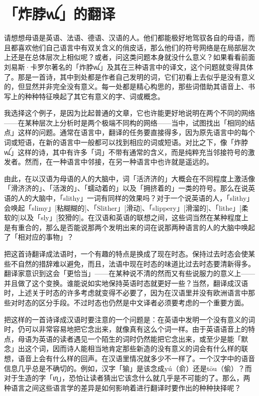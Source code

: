 \documentclass[
  12pt,
  twoside,
  openright,
  oldfontcommands,
]{memoir}
\begin{document}
\section{「炸脖{\gebfont ꪡ}」的翻译}

请想想母语是英语、法语、德语、汉语的人。他们都能极好地驾驭各自的母语，而且都喜欢他们自己语言中有双关含义的俏皮话，那么他们的符号网络是在局部层次上还是在总体层次上相似呢？或者，问这类问题本身就没什么意义？如果看看前面刘易斯·卡罗尔著名的「炸脖{\gebfont ꪡ}」及其在三种语言中的译文，这个问题就变得具体了。那是一首诗，其中到处都是作者自己发明的词，它们初看上去似乎是没有意义的，但显然并非完全没有意义。每一处都是精心构思的，那些词借助其语音上、书写上的种种特征唤起了其它有意义的字、词或概念。

我选择这个例子，是因为比起普通的文章，它也许能更好地说明在两个不同的网络------在某种层次上分析时是两个极端不同构的网络------当中，试图找出「相同的结点」这样的问题。通常在语言中，翻译的任务要直接得多，因为原先语言中的每个词或短语，在新的语言中一般都可以找到相应的词或短语。对比之下，像「炸脖{\gebfont ꪡ}」这样的诗，其中有许多「词」不带有通常的含义，而是纯粹充当邻接符号的激发者。然而，在一种语言中邻接，在另一种语言中也许就是遥远的。

由此，在以汉语为母语的人的大脑中，词「活济济的」大概会在不同程度上激活像「滑济济的」、「活泼的」、「蠕动着的」以及「拥挤着的」一类的符号。那么在说英语的人的大脑中，「slithy」一词有同样的效果吗？对于一个说英语的人，「slithy」会唤起「slimy」{[}粘糊糊的{]}、「Slither」{[}滑动{]}、「slippery」{[}滑溜的{]}、「lithe」{[}柔软的{]}以及「sly」{[}狡猾的{]}。在汉语和英语的联想之间，这些词当然在某种程度上是有重合的，那么是否能说那两个发明出来的词在说那两种语言的人的大脑中唤起了「相对应的事物」？

把这首诗翻译成法语时，一个有趣的特点是换成了现在时态。保持过去时态会使某些不自然的措辞难以避免，而且，法语中现在时态的味道比过去时态要清新得多。翻译家意识到这会「更恰当」------在某种说不清的然而又有些说服力的意义上------并且做了这个变换。谁能说如实地保持英语时态就更好一些？当然，翻译成汉语时，上述关于时态的许多考虑就变得不必要了，因为在汉语里并没有欧洲语言中那些对时态的区分手段。不过时态也仍然是中文译者必须要考虑的一个重要方面。

把这样的一首诗译成汉语时要注意的一个问题是：在英语中发明一个没有意义的词时，仍可以非常容易地把它念出来，就像真有这么个词一样。由于英语语音上的特点，母语为英语的读者遇见一个陌生的词时仍然能把它念出来，或至少是能「默念」出这个词，因而诗人能相当地肯定那些新造的没有意义的词会有什么样的联想，语音上会有什么样的回声。在汉语里情况就多少不一样了。一个汉字中的语音信息几乎总是不确切的。例如，汉字「㺄」是该念成yú（俞）还是tōu（偷）？而对于生造的字「{\gebfont ꪨ}」，恐怕让读者猜出它该念什么就几乎是不可能的了。那么，两种语言之间这些语言学的差异是如何影响着进行翻译时要作出的种种抉择呢？
\end{document}
